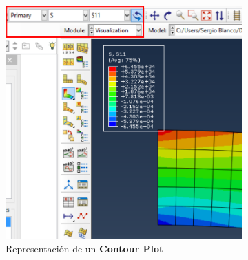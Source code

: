 \begin{enumerate}
 \begin{figure}[H]
   \centering
   \begin{subfigure}{0.35\textwidth}
     \includegraphics[width=\textwidth]{./body/images/imagen87.pdf}
     \caption{Representación de un \textbf{Contour Plot}}
     \label{figu87}
   \end{subfigure}%
   ~ %
   \begin{subfigure}{0.29\textwidth}

\end{subfigure}
\end{figure}
\end{enumerate}
